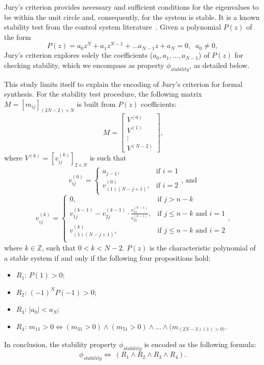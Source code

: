 \documentclass[runningheads,a4paper]{llncs}
\begin{document}
Jury's criterion provides necessary and sufficient conditions for the eigenvalues 
to be within the unit circle and, consequently, for the system is stable.  
It is a known stability test from the control system literature~\cite{fadali}.  
Given a 
polynomial $P(z)$ of the form
$$
P(z) = a_{0}z^{N} + a_{1}z^{N-1} + ... a_{N-1}z + a_{N} = 0, \;\; a_{0}\neq 0,
$$
Jury's criterion explores solely the coefficients ($a_{0},a_{1},...,a_{N-1}$) 
of $P(z)$ for checking stability, which we encompass as property $\phi_{stability}$, as detailed below. 

This study limits itself to explain the encoding of Jury's criterion for formal synthesis.  
For the stability  test procedure, the following matrix 
$M=[m_{ij}]_{(2N-2)\times N}$ is built  from $P(z)$ coefficients:
$$
M=\left[
\begin{matrix}
  V^{(0)} \\
  V^{(1)} \\
  \vdots \\
  V^{(N-2)}
 \end{matrix}
\right]\mbox{,}
$$
\noindent where $V^{(k)}=[v^{(k)}_{ij}]_{2\times N}$ is such that
$$
v^{(0)}_{ij}=\begin{cases} 
a_{j-1}, & \mbox{if } i=1 \\   v^{(0)}_{(1)(N-j+1)}, & \mbox{if } i=2 
\end{cases}\mbox{, and} 
$$
$$
v^{(k)}_{ij}=\begin{cases} 
0, & \mbox{if } j>n-k\\
v^{(k-1)}_{1j}-v^{(k-1)}_{2j}\cdot\frac{v^{(k-1)}_{11}}{v^{(k-1)}_{21}}, & \mbox{if } j\leq n-k  \mbox{ and } i=1 \\
v^{(k)}_{(1)(N-j+1)}, & \mbox{if } j\leq n-k \mbox{ and } i=2 \\
\end{cases} \mbox{,}
$$
\noindent where $k\in\mathbb{Z}$, such that $0<k<N-2$. $P(z)$ is the 
characteristic polynomial of a stable system if and only if the following 
four propositions hold:
\begin{itemize}
\item $R_{1}$: $P(1)>0$;
\item $R_{2}$: $(-1)^{N}P(-1)>0$;
\item $R_{3}$: $\vert{a_{0}}\vert <a_{N}$;
\item $R_{4}$: $m_{11}>0\iff (m_{31}>0)\wedge (m_{51}>0)\wedge \dots \wedge (m_{(2N-3)(1)>0)}$.
\end{itemize}
In conclusion, the stability property $\phi_{stability}$ is encoded as the following formula:
$$
\phi_{stability}\iff \ (R_{1} \wedge R_{2} \wedge R_{3} \wedge R_{4}).
$$
\end{document}
